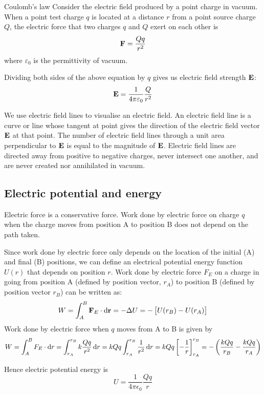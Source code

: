 \begin{thrm}{Coulomb's law}{}
Consider the electric field produced by a point charge in vacuum. When a point test charge $q$ is located at a distance $r$ from a point source charge $Q$, the electric force that two charges $q$ and $Q$ exert on each other is
\begin{equation}
{\vb{F} = \frac{Qq}{r^2}
}\end{equation}
where $\varepsilon_0$ is the permittivity of vacuum.
\end{thrm}

Dividing both sides of the above equation by $q$ gives us electric field strength $\vb{E}$:
\begin{equation}
{\vb{E} = \frac{1}{4\pi\varepsilon_0}\frac{Q}{r^2}
}\end{equation}

We use electric field lines to visualise an electric field. An electric field line is a curve or line whose tangent at point gives the direction of the electric field vector $\vb{E}$ at that point. The number of electric field lines through a unit area perpendicular to $\vb{E}$ is equal to the magnitude of $\vb{E}$. Electric field lines are directed away from positive to negative charges, never intersect one another, and are never created nor annihilated in vacuum.

\subsection{Electric potential and energy}
Electric force is a conservative force. Work done by electric force on charge $q$ when the charge moves from position A to position B does not depend on the path taken.

Since work done by electric force only depends on the location of the initial (A) and final (B) positions, we can define an electrical potential energy function $U(r)$ that depends on position $r$. Work done by electric force $F_E$ on a charge in going from position A (defined by position vector, $r_A$) to position B (defined by position vector $r_B$) can be written as:
\[ W = \int_A^B \vb{F}_E \cdot \dd{\vb{r}} = -\Delta U = -\left[U(r_B)-U(r_A)\right] \]
Work done by electric force when $q$ moves from A to B is given by
\[ W = \int_A^B F_E\cdot\dd{r} = \int_{r_A}^{r_B} k\frac{Qq}{r^2} \dd{r} = kQq \int_{r_A}^{r_B} \frac{1}{r^2} \dd{r} = kQq\left[-\frac{1}{r}\right]_{r_A}^{r_B} = -\left(\frac{kQq}{r_B} - \frac{kQq}{r_A}\right) \]

Hence electric potential energy is
\begin{equation}
U = \frac{1}{4\pi\epsilon_0}\frac{Qq}{r}
\end{equation}

